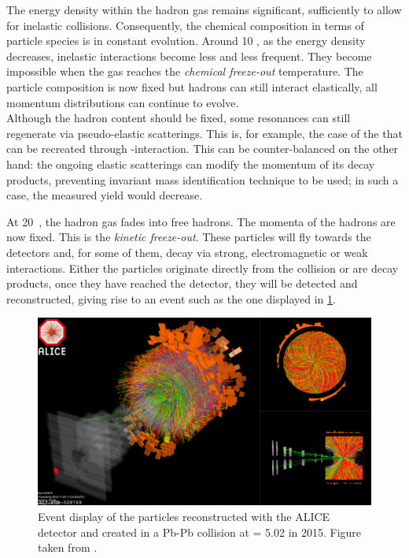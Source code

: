 The energy density within the hadron gas remains significant, sufficiently to allow for inelastic collisions. Consequently, the chemical composition in terms of particle species is in constant evolution. Around 10 \fmC, as the energy density decreases, inelastic interactions become less and less frequent. They become impossible when the gas reaches the \textit{chemical freeze-out} temperature. The particle composition is now fixed but hadrons can still interact elastically, all momentum distributions can continue to evolve.\\

Although the hadron content should be fixed, some resonances can still regenerate via pseudo-elastic scatterings. This is, for example, the case of the \rmKstarZero that can be recreated through \rmPiPM-\Kminplus interaction. This can be counter-balanced on the other hand: the ongoing elastic scatterings can modify the momentum of its decay products, preventing invariant mass identification technique to be used; in such a case, the measured yield would decrease.

At 20~\fmC, the hadron gas fades into free hadrons. The momenta of the hadrons are now fixed. This is the \textit{kinetic freeze-out}. These particles will fly towards the detectors and, for some of them, decay via strong, electromagnetic or weak interactions. Either the particles originate directly from the collision or are decay products, once they have reached the detector, they will be detected and reconstructed, giving rise to an event such as the one displayed in \fig\ref{fig:ALICEEventDisplay}.

\begin{figure}[h]
	\centering
	\includegraphics[width=\textwidth]{Figs/Chapter2/ALICE_EventDisplay.eps}
	\caption{Event display of the particles reconstructed with the ALICE detector and created in a Pb-Pb collision at \sqrtSnn = 5.02 \tev in 2015. Figure taken from \cite{alicecollaborationALICEExperimentJourney2022}.}
	\label{fig:ALICEEventDisplay}
\end{figure}

